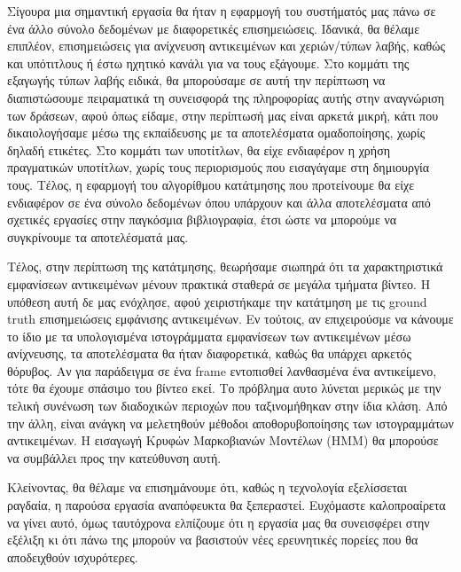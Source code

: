 \documentclass[11pt,a4paper,english,greek,twoside]{../Thesis}
\begin{document}
\par Σίγουρα μια σημαντική εργασία θα ήταν η εφαρμογή του συστήματός μας πάνω σε ένα άλλο σύνολο δεδομένων με διαφορετικές επισημειώσεις. Ιδανικά, θα θέλαμε επιπλέον, επισημειώσεις για ανίχνευση αντικειμένων και χεριών/τύπων λαβής, καθώς και υπότιτλους ή έστω ηχητικό κανάλι για να τους εξάγουμε. Στο κομμάτι της εξαγωγής τύπων λαβής ειδικά, θα μπορούσαμε σε αυτή την περίπτωση να διαπιστώσουμε πειραματικά τη συνεισφορά της πληροφορίας αυτής στην αναγνώριση των δράσεων, αφού όπως είδαμε, στην περίπτωσή μας είναι αρκετά μικρή, κάτι που δικαιολογήσαμε μέσω της εκπαίδευσης με τα αποτελέσματα ομαδοποίησης, χωρίς δηλαδή ετικέτες. Στο κομμάτι των υποτίτλων, θα είχε ενδιαφέρον η χρήση πραγματικών υποτίτλων, χωρίς τους περιορισμούς που εισαγάγαμε στη δημιουργία τους. Τέλος, η εφαρμογή του αλγορίθμου κατάτμησης που προτείνουμε θα είχε ενδιαφέρον σε ένα σύνολο δεδομένων όπου υπάρχουν και άλλα αποτελέσματα από σχετικές εργασίες στην παγκόσμια βιβλιογραφία, έτσι ώστε να μπορούμε να συγκρίνουμε τα αποτελέσματά μας.

\par Τέλος, στην περίπτωση της κατάτμησης, θεωρήσαμε σιωπηρά ότι τα χαρακτηριστικά εμφανίσεων αντικειμένων μένουν πρακτικά σταθερά σε μεγάλα τμήματα βίντεο. Η υπόθεση αυτή δε μας ενόχλησε, αφού χειριστήκαμε την κατάτμηση με τις ground truth επισημειώσεις εμφάνισης αντικειμένων. Εν τούτοις, αν επιχειρούσμε να κάνουμε το ίδιο με τα υπολογισμένα ιστογράμματα εμφανίσεων των αντικειμένων μέσω ανίχνευσης, τα αποτελέσματα θα ήταν διαφορετικά, καθώς θα υπάρχει αρκετός θόρυβος. Αν για παράδειγμα σε ένα frame εντοπισθεί λανθασμένα ένα αντικείμενο, τότε θα έχουμε σπάσιμο του βίντεο εκεί. Το πρόβλημα αυτο λύνεται μερικώς με την τελική συνένωση των διαδοχικών περιοχών που ταξινομήθηκαν στην ίδια κλάση. Από την άλλη, είναι ανάγκη να μελετηθούν μέθοδοι αποθορυβοποίησης των ιστογραμμάτων αντικειμένων. Η εισαγωγή Κρυφών Μαρκοβιανών Μοντέλων (ΗΜΜ) θα μπορούσε να συμβάλλει προς την κατεύθυνση αυτή.

\par Κλείνοντας, θα θέλαμε να επισημάνουμε ότι, καθώς η τεχνολογία εξελίσσεται ραγδαία, η παρούσα εργασία αναπόφευκτα θα ξεπεραστεί. Ευχόμαστε καλοπροαίρετα να γίνει αυτό, όμως ταυτόχρονα ελπίζουμε ότι η εργασία μας θα συνεισφέρει στην εξέλιξη κι ότι πάνω της μπορούν να βασιστούν νέες ερευνητικές πορείες που θα αποδειχθούν ισχυρότερες.
\end{document}
